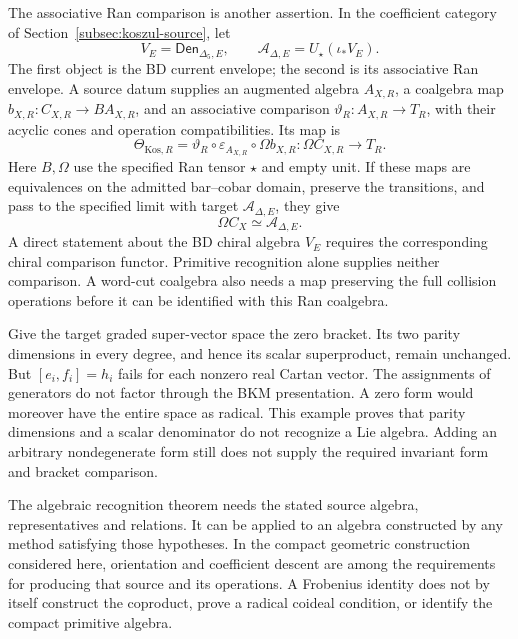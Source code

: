 The associative Ran comparison is another assertion.  In the
coefficient category of Section~\ref{subsec:koszul-source}, let
\[
 V_E=\mathsf{Den}_{\Delta_5,E},\qquad
 \mathcal A_{\Delta,E}=U_\star(\iota_*V_E).
\]
The first object is the BD current envelope; the second is its
associative Ran envelope.  A source datum supplies an augmented
algebra \(A_{X,R}\), a coalgebra map
\(b_{X,R}:C_{X,R}\to BA_{X,R}\), and an associative comparison
\(\vartheta_R:A_{X,R}\to T_R\), with their acyclic cones and
operation compatibilities.  Its map is
\[
 \Theta_{\mathrm{Kos},R}
 =\vartheta_R\circ\varepsilon_{A_{X,R}}\circ\Omega b_{X,R}:
 \Omega C_{X,R}\longrightarrow T_R.
\]
Here \(B,\Omega\) use the specified Ran tensor \(\star\) and empty
unit.  If these maps are equivalences on the admitted bar--cobar
domain, preserve the transitions, and pass to the specified limit
with target \(\mathcal A_{\Delta,E}\), they give
\[
 \Omega C_X\simeq\mathcal A_{\Delta,E}.
\]
A direct statement about the BD chiral algebra \(V_E\) requires
the corresponding chiral comparison functor.  Primitive recognition
alone supplies neither comparison.  A word-cut coalgebra also needs
a map preserving the full collision operations before it can be
identified with this Ran coalgebra.

\begin{remark}
\label{rmk:ch6-zero-bracket-counterexample}
Give the target graded super-vector space the zero bracket.
Its two parity dimensions in every degree, and hence its scalar
superproduct, remain unchanged.  But
\([e_i,f_i]=h_i\) fails for each nonzero real Cartan vector.
The assignments of generators do not factor through the BKM
presentation.  A zero form would moreover have the entire space
as radical.  This example proves that parity dimensions and a
scalar denominator do not recognize a Lie algebra.  Adding an
arbitrary nondegenerate form still does not supply the required
invariant form and bracket comparison.
\end{remark}

\begin{remark}
\label{rmk:ch6-recognition-without-orientation}
The algebraic recognition theorem needs the stated source algebra,
representatives and relations.  It can be applied to an algebra
constructed by any method satisfying those hypotheses.  In the
compact geometric construction considered here, orientation and
coefficient descent are among the requirements for producing that
source and its operations.  A Frobenius identity does not by itself
construct the coproduct, prove a radical coideal condition, or
identify the compact primitive algebra.
\end{remark}

